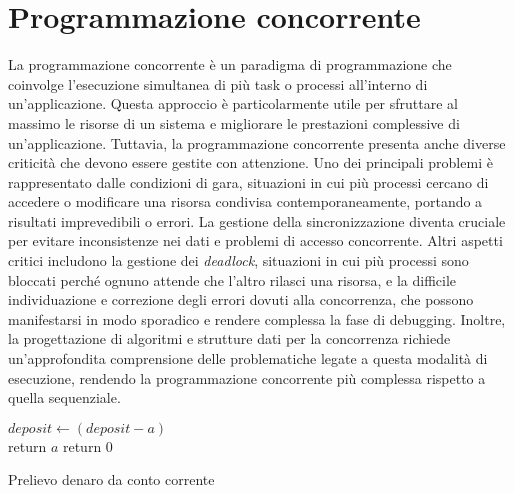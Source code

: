\section[Programmazione concorrente]{Programmazione concorrente}
La programmazione concorrente è un paradigma di programmazione che coinvolge l'esecuzione simultanea di più task o processi all'interno di un'applicazione.
Questa approccio è particolarmente utile per sfruttare al massimo le risorse di un sistema e migliorare le prestazioni complessive di un'applicazione.
Tuttavia, la programmazione concorrente presenta anche diverse criticità che devono essere gestite con attenzione.
Uno dei principali problemi è rappresentato dalle condizioni di gara, situazioni in cui più processi cercano di accedere o modificare una risorsa condivisa contemporaneamente, portando a risultati imprevedibili o errori.
La gestione della sincronizzazione diventa cruciale per evitare inconsistenze nei dati e problemi di accesso concorrente.
Altri aspetti critici includono la gestione dei \textit{deadlock}, situazioni in cui più processi sono bloccati perché ognuno attende che l'altro rilasci una risorsa, e la difficile individuazione e correzione degli errori dovuti alla concorrenza, che possono manifestarsi in modo sporadico e rendere complessa la fase di debugging.
Inoltre, la progettazione di algoritmi e strutture dati per la concorrenza richiede un'approfondita comprensione delle problematiche legate a questa modalità di esecuzione, rendendo la programmazione concorrente più complessa rispetto a quella sequenziale.

\begin{algorithm}[H]

      {
        $deposit \leftarrow (deposit - a)$ \\
        return $a$\;
      }
      {
        return $0$\;
      }
    \caption{Prelievo denaro da conto corrente}
\end{algorithm}

